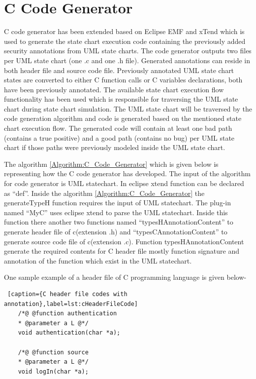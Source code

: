 \section{C Code Generator}
C code generator \cite{ref_108_paul2015infoflow} has been extended based on Eclipse EMF and xTend which is used to generate the state chart execution code containing the previously added security annotations from UML state charts. The code generator outputs two files per UML state chart (one .c and one
.h file). Generated annotations can reside in both header file
and source code file. Previously annotated UML state chart
states are converted to either C function calls or C variables
declarations, both have been previously annotated. The available state chart execution flow functionality has been used which is
responsible for traversing the UML state chart during state
chart simulation. The UML state chart will be traversed by the code generation algorithm and code is generated based on
the mentioned state chart execution flow. The generated code
will contain at least one bad path (contains a true positive) and
a good path (contains no bug) per UML state chart if those
paths were previously modeled inside the UML state chart.

The algorithm \ref{Algorithm:C_Code_Generator} which is given below is representing how the C code generator has developed. The input of the algorithm for code generator is UML statechart. In eclipse xtend \cite{ref_20_xtend} function can be declared as \enquote{def}. Inside the algorithm \ref{Algorithm:C_Code_Generator} the generateTypeH function requires the input of UML statechart. The plug-in named \enquote{MyC} uses eclipse xtend to parse the UML statechart. Inside this function there another two functions named \enquote{typesHAnnotationContent} to generate header file of c(extension .h) and \enquote{typesCAnnotationContent} to generate source code file of c(extension .c). Function typesHAnnotationContent generate the required contents for C header file mostly function signature and annotation of the function which exist in the UML statechart. 

One sample example of a header file of C programming language is given below-

\begin{lstlisting} [caption={C header file codes with annotation},label=lst:cHeaderFileCode]
	/*@ @function authentication
	* @parameter a L @*/
	void authentication(char *a);
	
	/*@ @function source
	* @parameter a L @*/
	void logIn(char *a);
\end{lstlisting}

